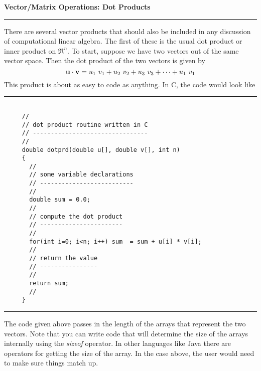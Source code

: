 \documentclass[10pt,fleqn]{article}
\begin{document}
\noindent
{\bf Vector/Matrix Operations: Dot Products}
\vskip0.1in\hrule\vskip0.1in
\noindent
There are several vector products that should also be included in any discussion
of computational linear algebra. The first of these is the usual dot product or
inner product on $\Re^n$. To start, suppose we have two vectors out of the same
vector space. Then the dot product of the two vectors is given by
$$
  {\bf u} \cdot {\bf v} = u_1\ v_1 + u_2\ v_2 + u_3\ v_3 + \cdots + u_1\ v_1
$$
This product is about as easy to code as anything. In C, the code would look
like
\vskip0.1in\hrule\vskip0.1in
\begin{verbatim}

     //
     // dot product routine written in C
     // --------------------------------
     //
     double dotprd(double u[], double v[], int n)
     {
       //
       // some variable declarations
       // --------------------------
       //
       double sum = 0.0;
       //
       // compute the dot product
       // -----------------------
       //
       for(int i=0; i<n; i++) sum  = sum + u[i] * v[i];
       //
       // return the value
       // ----------------
       //
       return sum;
       //
     }

\end{verbatim}
\vskip0.1in\hrule\vskip0.1in
The code given above passes in the length of the arrays that represent the two
vectors. Note that you can write code that will determine the size of the arrays
internally using the {\it sizeof} operator. In other languages like Java there
are operators for getting the size of the array. In the case above, the user
would need to make sure things match up.
\end{document}
